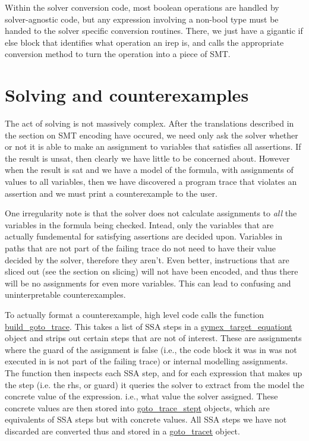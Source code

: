 \documentclass{article}
\begin{document}
Within the solver conversion code, most boolean operations are handled by
solver-agnostic code, but any expression involving a non-bool type must be
handed to the solver specific conversion routines. There, we just have a
gigantic if else block that identifies what operation an irep is, and calls
the appropriate conversion method to turn the operation into a piece of SMT.

\section{Solving and counterexamples}

The act of solving is not massively complex. After the translations described
in the section on SMT encoding have occured, we need only ask the solver
whether or not it is able to make an assignment to variables that satisfies
all assertions. If the result is unsat, then clearly we have little to be
concerned about. However when the result is sat and we have a model of the
formula, with assignments of values to all variables, then we have discovered
a program trace that violates an assertion and we must print a counterexample
to the user.

One irregularity note is that the solver does not calculate assignments to
\textit{all} the variables in the formula being checked. Intead, only the
variables that are actually fundemental for satisfying assertions are
decided upon. Variables in paths that are not part of the failing trace do
not need to have their value decided by the solver, therefore they aren't.
Even better, instructions that are sliced out (see the section on slicing)
will not have been encoded, and thus there will be no assignments for even
more variables. This can lead to confusing and uninterpretable counterexamples.

To actually format a counterexample, high level code calls the function
\url{build_goto_trace}. This takes a list of SSA steps in a
\url{symex_target_equationt} object and strips out certain steps that are not
of interest. These are assignments where the guard of the assignment is false
(i.e., the code block it was in was not executed in is not part of the failing
trace) or internal modelling assignments. The function then inspects each
SSA step, and for each expression that makes up the step (i.e. the rhs,
or guard) it queries the solver to extract from the model the concrete value
of the expression. i.e., what value the solver assigned. These concrete values
are then stored into \url{goto_trace_stept} objects, which are equivalents of
SSA steps but with concrete values. All SSA steps we have not discarded are
converted thus and stored in a \url{goto_tracet} object.
\end{document}
